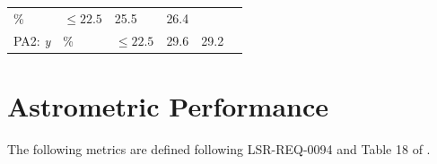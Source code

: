\documentclass[DM,toc]{lsstdoc}
\begin{document}
\begin{longtable}[]{@{}llllll@{}}
\begin{minipage}[t]{0.06\columnwidth}
\%\strut
\end{minipage} & \begin{minipage}[t]{0.14\columnwidth}\raggedright\strut
\(\leq 22.5\)\strut
\end{minipage} & \begin{minipage}[t]{0.12\columnwidth}\raggedright\strut
25.5\strut
\end{minipage} & \begin{minipage}[t]{0.12\columnwidth}\raggedright\strut
26.4\strut
\end{minipage} & \begin{minipage}[t]{0.17\columnwidth}\raggedright\strut
\strut
\end{minipage}\tabularnewline
\begin{minipage}[t]{0.12\columnwidth}\raggedright\strut
PA2: \emph{y}\strut
\end{minipage} & \begin{minipage}[t]{0.06\columnwidth}\raggedright\strut
\%\strut
\end{minipage} & \begin{minipage}[t]{0.14\columnwidth}\raggedright\strut
\(\leq 22.5\)\strut
\end{minipage} & \begin{minipage}[t]{0.12\columnwidth}\raggedright\strut
29.6\strut
\end{minipage} & \begin{minipage}[t]{0.12\columnwidth}\raggedright\strut
29.2\strut
\end{minipage} & \begin{minipage}[t]{0.17\columnwidth}\raggedright\strut
\strut
\end{minipage}\tabularnewline
\bottomrule
\end{longtable}

\section{Astrometric Performance}\label{astrometric-performance}

The following metrics are defined following LSR-REQ-0094
 and Table 18 of .
\end{document}
